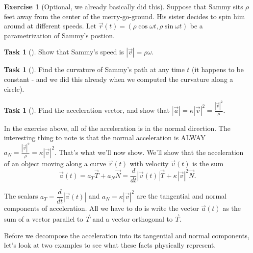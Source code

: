 \documentclass[10pt,]{book}
\theoremstyle{plain}
\theoremstyle{definition}
\theoremstyle{definition}
\theoremstyle{definition}
\theoremstyle{definition}
\newtheorem{exploration}[project]{Exercise}
\newtheorem{task}[project]{Task}
\theoremstyle{definition}
\numberwithin{equation}{section}
\newcommand{\ds}{\displaystyle}
\begin{document}
\begin{exploration}[Optional, we already basically did this]\label{exploration-182}
Suppose that Sammy sits \(\rho\) feet away from the center of the merry-go-ground. His sister decides to spin him around at different speeds. Let \(\vec r(t) = (\rho \cos \omega t, \rho \sin \omega t)\) be a parametrization of Sammy's postion.%
\begin{task}[]\label{task-450}
Show that Sammy's speed is \(|\vec v|=\rho \omega\).%
\end{task}
\begin{task}[]\label{task-451}
Find the curvature of Sammy's path at any time \(t\) (it happens to be constant - and we did this already when we computed the curvature along a circle).%
\end{task}
\begin{task}[]\label{task-452}
Find the acceleration vector, and show that \(\ds |\vec a| = \kappa |\vec v|^2 = \frac{|\vec v|^2}{\rho}\).%
\end{task}
\end{exploration}
In the exercise above, all of the acceleration is in the normal direction. The interesting thing to note is that the normal acceleration is ALWAY \(a_N =  \frac{|\vec v|^2}{\rho}=\kappa |\vec v|^2\). That's what we'll now show. We'll show that the acceleration of an object moving along a curve \(\vec r(t)\) with velocity \(\vec v(t)\) is the sum%
\begin{equation*}
\vec a(t) = a_T\vec T+a_N\vec N=\frac{d}{dt}|\vec v(t)| \vec T + \kappa |\vec v|^2 \vec N.
\end{equation*}
%
\par
The scalars \(a_T=\dfrac{d}{dt}|\vec v(t)|\) and \(a_N=\kappa |\vec v|^2\) are the tangential and normal components of acceleration. All we have to do is write the vector \(\vec a(t)\) as the sum of a vector parallel to \(\vec T\) and a vector orthogonal to \(\vec T\).%
\par
Before we decompose the acceleration into its tangential and normal components, let's look at two examples to see what these facts physically represent.%
\end{document}

